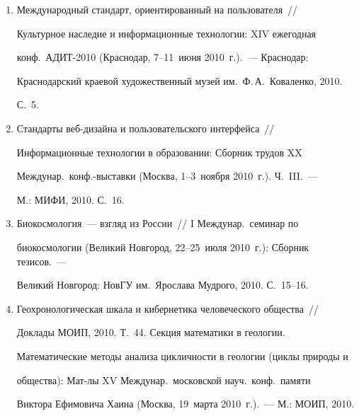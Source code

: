 \begin{enumerate}[1.]
информационных объектов~/\!\!/  Оптико-элек\-т\-рон\-ные приборы и устройства 


в сис\-те\-мах распознавания образов, обработки изображений и символьной 


информации (Распознавание-2010): Мат-лы IX Междунар.\ 


науч.-техн.\ конф.\ (Курск, 18--20~мая 2010~г.).~--- Курск: КурскГТУ, 2010. 


С.~127--129.


\item {}


Международный стандарт, ориентированный на пользователя~/\!\!/  


Культурное наследие и информационные технологии: XIV ежегодная 


конф.\ АДИТ-2010 (Краснодар, 7--11~июня 2010~г.).~--- Краснодар: 


Краснодарский краевой художественный музей им.\ Ф.\,А.~Коваленко, 2010. 


С.~5.


\item {}


Стандарты веб-дизайна и пользовательского интерфейса~/\!\!/  


Информационные технологии в образовании: Сборник трудов XX 


Междунар.\ конф.-выставки (Москва, 1--3~ноября 2010~г.). Ч.~III.~--- 


М.: МИФИ, 2010. С.~16.


\item {}


Биокосмология~--- взгляд из России~/\!\!/  I Междунар.\ семинар по 


биокосмологии (Великий Новгород, 22--25~июля 2010~г.): Сборник тезисов.~--- 


Великий Новгород: НовГУ им.\ Ярослава Мудрого, 2010. С.~15--16.


\item {}


Геохронологическая шкала и кибернетика человеческого общества~/\!\!/  


Доклады МОИП, 2010. Т.~44. Секция математики в геологии. 


Математические методы анализа цикличности в геологии (циклы природы и 


общества): Мат-лы XV Междунар.\ московской науч.\ конф.\ памяти 


Виктора Ефимовича Хаина (Москва, 19~марта 2010~г.).~--- М.: МОИП, 2010. 



\end{enumerate}
